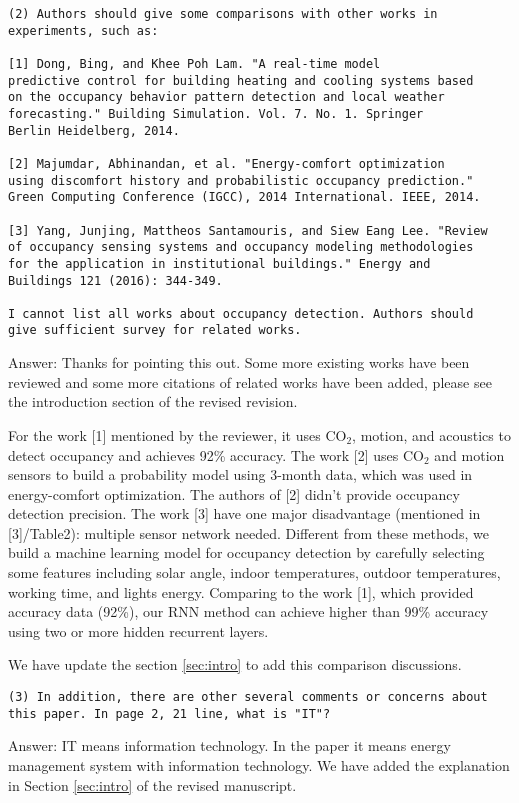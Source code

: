 \begin{verbatim}
(2) Authors should give some comparisons with other works in
experiments, such as:

[1] Dong, Bing, and Khee Poh Lam. "A real-time model
predictive control for building heating and cooling systems based
on the occupancy behavior pattern detection and local weather
forecasting." Building Simulation. Vol. 7. No. 1. Springer
Berlin Heidelberg, 2014.

[2] Majumdar, Abhinandan, et al. "Energy-comfort optimization
using discomfort history and probabilistic occupancy prediction."
Green Computing Conference (IGCC), 2014 International. IEEE, 2014.

[3] Yang, Junjing, Mattheos Santamouris, and Siew Eang Lee. "Review
of occupancy sensing systems and occupancy modeling methodologies
for the application in institutional buildings." Energy and
Buildings 121 (2016): 344-349.

I cannot list all works about occupancy detection. Authors should
give sufficient survey for related works.
\end{verbatim}

Answer: Thanks for pointing this out. Some more existing works have
been reviewed and some more citations of related works have been
added, please see the introduction section of the revised revision.

For the work [1] mentioned by the reviewer, it uses CO$_2$, motion,
and acoustics to detect occupancy and achieves 92\% accuracy. The work
[2] uses CO$_2$ and motion sensors to build a probability model using
3-month data, which was used in energy-comfort optimization. The
authors of [2] didn't provide occupancy detection precision. The work
[3] have one major disadvantage (mentioned in [3]/Table2): multiple
sensor network needed. Different from these methods, we build a
machine learning model for occupancy detection by carefully selecting
some features including solar angle, indoor temperatures, outdoor
temperatures, working time, and lights energy. Comparing to the work
[1], which provided accuracy data (92\%), our RNN method can achieve
higher than 99\% accuracy using two or more hidden recurrent layers.

We have update the section \ref{sec:intro} to add this comparison discussions.

\begin{verbatim}
(3) In addition, there are other several comments or concerns about
this paper. In page 2, 21 line, what is "IT"?
\end{verbatim}
Answer: IT means information technology. In the paper it means energy
management system with information technology. We have added the explanation in
Section \ref{sec:intro} of the revised manuscript.

